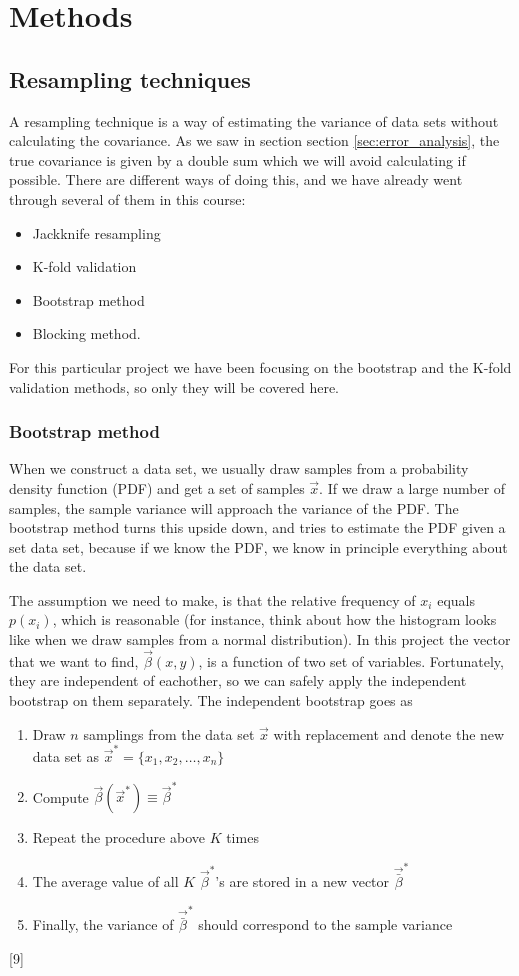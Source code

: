 \section{Methods} \label{sec:methods}

\subsection{Resampling techniques} \label{sec:resampling}
A resampling technique is a way of estimating the variance of data sets without calculating the covariance. As we saw in section section \ref{sec:error_analysis}, the true covariance is given by a double sum which we will avoid calculating if possible. There are different ways of doing this, and we have already went through several of them in this course:
\begin{itemize}
\item{Jackknife resampling}
\item{K-fold validation}
\item{Bootstrap method}
\item{Blocking method}.
\end{itemize}

For this particular project we have been focusing on the bootstrap and the K-fold validation methods, so only they will be covered here.

\subsubsection{Bootstrap method} \label{sec:bootstrap}
When we construct a data set, we usually draw samples from a probability density function (PDF) and get a set of samples $\vec{x}$. If we draw a large number of samples, the sample variance will approach the variance of the PDF. The bootstrap method turns this upside down, and tries to estimate the PDF given a set data set, because if we know the PDF, we know in principle everything about the data set. 

The assumption we need to make, is that the relative frequency of $x_i$ equals $p(x_i)$, which is reasonable (for instance, think about how the histogram looks like when we draw samples from a normal distribution). In this project the vector that we want to find, $\vec{\beta}(x,y)$, is a function of two set of variables. Fortunately, they are independent of eachother, so we can safely apply the independent bootstrap on them separately. The independent bootstrap goes as
\begin{enumerate}
\item Draw $n$ samplings from the data set $\vec{x}$ with replacement and denote the new data set as $\vec{x}^*=\{x_1,x_2,\hdots,x_n\}$
\item Compute $\vec{\beta}(\vec{x}^*)\equiv\vec{\beta}^*$
\item Repeat the procedure above $K$ times
\item The average value of all $K$ $\vec{\beta}^*$'s are stored in a new vector $\vec{\bar{\beta}}^*$
\item Finally, the variance of $\vec{\bar{\beta}}^*$ should correspond to the sample variance
\end{enumerate}
[9]


